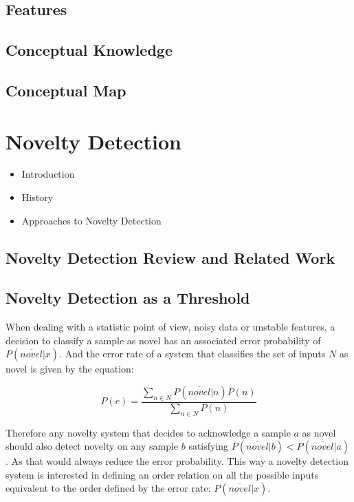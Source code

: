\section{Features}
\section{Conceptual Knowledge}
\section{Conceptual Map}

\chapter{Novelty Detection}\label{chap:novelty-intro}
\begin{itemize}
\item Introduction
\item History
\item Approaches to Novelty Detection
\end{itemize}
\section{Novelty Detection Review and Related Work}

\section{Novelty Detection as a Threshold}
When dealing with a statistic point of view, noisy data or unstable features, a decision to
classify a sample as novel has an associated error probability of $P(\overline{novel}|x)$.
And the error rate of a system that classifies the set of inputs $N$ as novel is given by
the equation:

\begin{equation}
P(e) = \frac{\sum_{n \in N}{P(\overline{novel}|n)P(n)}}{\sum_{n \in N}{P(n)}}
\end{equation}

Therefore any novelty system that decides to acknowledge a sample
$a$ as novel should also detect novelty on any sample $b$ satisfying
$P(\overline{novel}|b) < P(\overline{novel}|a)$.
As that would always reduce the error probability.
This way a novelty detection system is interested in defining an
order relation on all the possible inputs equivalent to the order defined by
the error rate: $P(\overline{novel}|x)$.

